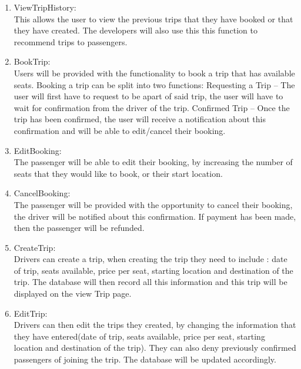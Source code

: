 \documentclass[hidelinks, 12pt, a4paper]{article}
\begin{document}
             \begin{enumerate}[label=U1.\arabic*]

                \item ViewTripHistory:\\
                This allows the user to view the previous trips that they have booked or that they have created. The developers will also use this this function to recommend trips to passengers.\\

                \item BookTrip:\\
                Users will be provided with the functionality to book a trip that has available seats. Booking a trip can be split into two functions: 
                Requesting a Trip – The user will first have to request to be apart of said trip, the user will have to wait for confirmation from the driver of the trip.
                Confirmed Trip – Once the trip has been confirmed, the user will receive a notification about this confirmation and will be able to edit/cancel their booking.\\

                \item EditBooking:\\
                The passenger will be able to edit their booking, by increasing the number of seats that they would like to book, or their start location.\\
                	
                \item CancelBooking: \\
                The passenger will be provided with the opportunity to cancel their booking, the driver will be notified about this confirmation. If payment has been made, then the passenger will be refunded.\\
                    
                \item CreateTrip:\\
                Drivers can create a  trip, when creating the trip they need to include : date of trip, seats available, price per seat, starting location and destination of the trip. The database will then record all this information and this trip will be displayed on the view Trip page.\\
                    
                \item EditTrip:\\
                Drivers can then edit the trips they created, by changing the information that they have entered(date of trip, seats available, price per seat, starting location and destination of the trip). They can also deny previously confirmed passengers of joining the trip. The database will be updated accordingly.\\


\end{enumerate}
\end{document}
